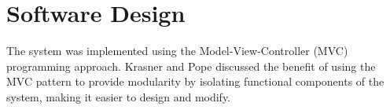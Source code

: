 \section{Software Design}

The system was implemented using the Model-View-Controller (MVC) programming approach. Krasner and Pope \autocite{krasner-pope-88} discussed the benefit of using the MVC pattern to provide modularity by isolating functional components of the system, making it easier to design and modify.


 
